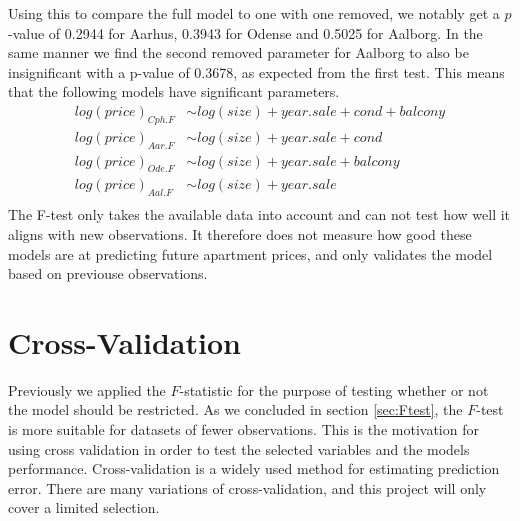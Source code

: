 Using this to compare the full model to one with one removed, we notably get a $p$-value of 0.2944 for Aarhus, 0.3943 for Odense and 0.5025 for Aalborg. 
In the same manner we find the second removed parameter for Aalborg to also be insignificant with a p-value of 0.3678, as expected from the first test.
This means that the following models have significant parameters.
\begin{align*}
    log(price)_{Cph.F} &\sim log(size) + year.sale + cond + balcony \\
    log(price)_{Aar.F} &\sim log(size) + year.sale + cond \\
    log(price)_{Ode.F} &\sim log(size) + year.sale + balcony \\
    log(price)_{Aal.F} &\sim log(size) + year.sale \\
\end{align*}
The F-test only takes the available data into account and can not test how well it aligns with new observations.
It therefore does not measure how good these models are at predicting future apartment prices, and only validates the model based on previouse observations. 



    
    
    

\section{Cross-Validation} \label{sec:CV}

Previously we applied the $F$-statistic for the purpose of testing whether or not the model should be restricted. 
As we concluded in section \ref{sec:Ftest}, the $F$-test is more suitable for datasets of fewer observations. 
This is the motivation for using cross validation in order to test the selected variables and the models performance.
Cross-validation is a widely used method for estimating prediction error.
There are many variations of cross-validation, and this project will only cover a limited selection. 

